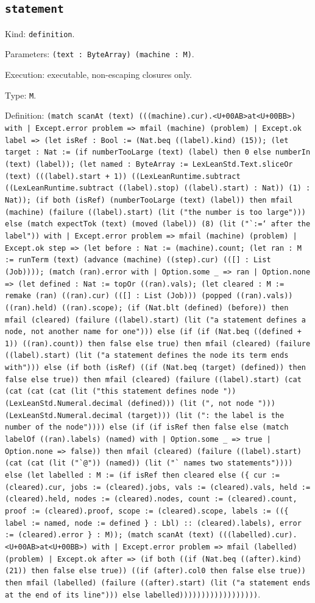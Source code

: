\documentclass[11pt]{article}
\begin{document}
\subsection*{\texttt{statement}}
\noindent Kind: \texttt{definition}.\par
\noindent Parameters: \texttt{(text : ByteArray) (machine : M)}.\par
\noindent Execution: executable, non-escaping closures only.\par
\noindent Type: \texttt{M}.\par
\noindent Definition: \texttt{(match scanAt (text) (((machine).cur).<U+00AB>at<U+00BB>) with | Except.error problem => mfail (machine) (problem) | Except.ok label => (let isRef : Bool := (Nat.beq ((label).kind) (15)); (let target : Nat := (if numberTooLarge (text) (label) then 0 else numberIn (text) (label)); (let named : ByteArray := LexLeanStd.Text.sliceOr (text) (((label).start + 1)) ((LexLeanRuntime.subtract ((LexLeanRuntime.subtract ((label).stop) ((label).start) : Nat)) (1) : Nat)); (if both (isRef) (numberTooLarge (text) (label)) then mfail (machine) (failure ((label).start) (lit ("the number is too large"))) else (match expectTok (text) (moved (label)) (8) (lit ("`:=` after the label")) with | Except.error problem => mfail (machine) (problem) | Except.ok step => (let before : Nat := (machine).count; (let ran : M := runTerm (text) (advance (machine) ((step).cur) (([] : List (Job)))); (match (ran).error with | Option.some \_ => ran | Option.none => (let defined : Nat := topOr ((ran).vals); (let cleared : M := remake (ran) ((ran).cur) (([] : List (Job))) (popped ((ran).vals)) ((ran).held) ((ran).scope); (if (Nat.blt (defined) (before)) then mfail (cleared) (failure ((label).start) (lit ("a statement defines a node, not another name for one"))) else (if (if (Nat.beq ((defined + 1)) ((ran).count)) then false else true) then mfail (cleared) (failure ((label).start) (lit ("a statement defines the node its term ends with"))) else (if both (isRef) ((if (Nat.beq (target) (defined)) then false else true)) then mfail (cleared) (failure ((label).start) (cat (cat (cat (cat (lit ("this statement defines node ")) (LexLeanStd.Numeral.decimal (defined))) (lit (", not node "))) (LexLeanStd.Numeral.decimal (target))) (lit (": the label is the number of the node")))) else (if (if isRef then false else (match labelOf ((ran).labels) (named) with | Option.some \_ => true | Option.none => false)) then mfail (cleared) (failure ((label).start) (cat (cat (lit ("`@")) (named)) (lit ("` names two statements")))) else (let labelled : M := (if isRef then cleared else (\{ cur := (cleared).cur, jobs := (cleared).jobs, vals := (cleared).vals, held := (cleared).held, nodes := (cleared).nodes, count := (cleared).count, proof := (cleared).proof, scope := (cleared).scope, labels := ((\{ label := named, node := defined \} : Lbl) :: (cleared).labels), error := (cleared).error \} : M)); (match scanAt (text) (((labelled).cur).<U+00AB>at<U+00BB>) with | Except.error problem => mfail (labelled) (problem) | Except.ok after => (if both ((if (Nat.beq ((after).kind) (21)) then false else true)) ((if (after).col0 then false else true)) then mfail (labelled) (failure ((after).start) (lit ("a statement ends at the end of its line"))) else labelled))))))))))))))))))}.\par
\end{document}
